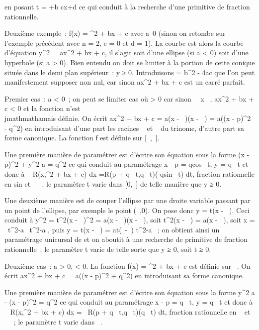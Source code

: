 \documentclass[]{article}
\begin{document}
en posant t = \rootn \ofax+b
\over cx+d  ce qui conduit à la recherche d'une
primitive de fraction rationnelle.

Deuxième exemple~: f(x) = \sqrtax^2  + bx +
c avec a\neq~0 (sinon on retombe sur l'exemple
précédent avec n = 2, c = 0 et d = 1). La courbe \Gamma est alors la courbe
d'équation y^2 = ax^2 + bx + c, il s'agit soit
d'une ellipse (si a \textless{} 0) soit d'une hyperbole (si a
\textgreater{} 0). Bien entendu on doit se limiter à la portion de cette
conique située dans le demi plan supérieur~: y ≥ 0. Introduisons \Delta =
b^2 - 4ac que l'on peut manifestement supposer non nul, car
sinon ax^2 + bx + c est un carré parfait.

Premier cas~: a \textless{} 0~; on peut se limiter cas où \Delta
\textgreater{} 0 car sinon \forall~~x \in {}~,
ax^2 + bx + c \textless{} 0 et la fonction n'est \\jmathmathamais
définie. On écrit ax^2 + bx + c = a(x - \alpha~)(x - \beta~) = a((x -
p)^2 - q^2) en introduisant d'une part les racines \alpha~
et \beta~ du trinome, d'autre part sa forme canonique. La fonction f est
définie sur {[}\alpha~,\beta~{]}.

Une première manière de paramétrer \Gamma est d'écrire son équation sous la
forme (x - p)^2 + y^2 \over
a = q^2 ce qui conduit au paramétrage x
- p = qcos~ t, y =
q\sqrtasin~
t et donc à \int ~
R(x,\sqrtax^2  + bx + c) dx
=\int  R(p + q\cos~
t,q\sqrtasin~
t)(-qsin~ t) dt, fraction rationnelle en
sin et \cos~ ~; le
paramètre t varie dans {[}0,\pi~{]} de telle manière que y ≥ 0.

Une deuxième manière est de couper l'ellipse \Gamma par une droite variable
passant par un point de l'ellipse, par exemple le point (\alpha~,0). On pose
donc y = t(x - \alpha~). Ceci conduit à y^2 = t^2(x -
\alpha~)^2 = a(x - \alpha~)(x - \beta~), soit t^2(x - \alpha~) = a(x - \beta~),
soit x = \alpha~t^2-a\beta~ \over t^2-a ,
puis y = t(x - \alpha~) = at(\beta~-\alpha~) \over t^2-a ~;
on obtient ainsi un paramétrage unicursal de \Gamma et on aboutit à une
recherche de primitive de fraction rationnelle~; le paramètre t varie de
telle sorte que y ≥ 0, soit t ≥ 0.

Deuxième cas~: a \textgreater{} 0, \Delta \textless{} 0. La fonction f(x) =
\sqrtax^2  + bx + c est définie sur ~. On
écrit ax^2 + bx + c = a((x - p)^2 +
q^2) en introduisant sa forme canonique.

Une première manière de paramétrer \Gamma est d'écrire son équation sous la
forme  y^2 \over a - (x - p)^2
= q^2 ce qui conduit au paramétrage x - p =
q\mathrmsh~ t, y =
q\sqrta\mathrmch~
t et donc à \int ~
R(x,\sqrtax^2  + bx + c) dx
=\int ~ R(p +
q\mathrmsh~
t,q\sqrta\mathrmch~
t)(q\mathrmch~ t) dt,
fraction rationnelle en
\mathrmsh~ et
\mathrmch~ ~; le paramètre t
varie dans ~.
\end{document}
